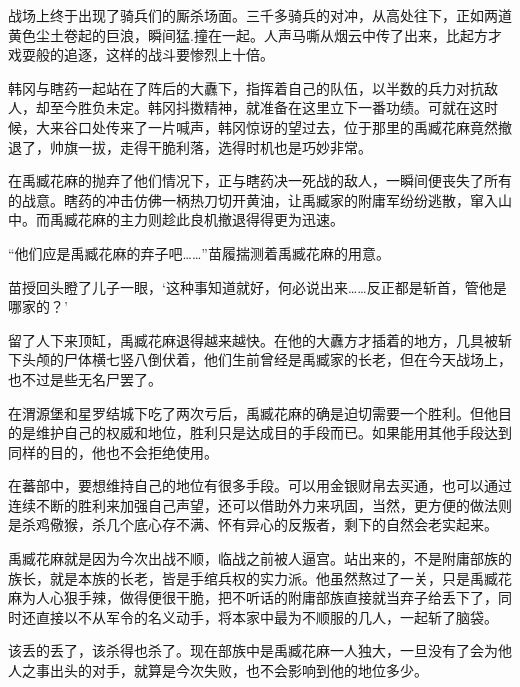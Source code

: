 战场上终于出现了骑兵们的厮杀场面。三千多骑兵的对冲，从高处往下，正如两道黄色尘土卷起的巨浪，瞬间猛.撞在一起。人声马嘶从烟云中传了出来，比起方才戏耍般的追逐，这样的战斗要惨烈上十倍。

韩冈与瞎药一起站在了阵后的大纛下，指挥着自己的队伍，以半数的兵力对抗敌人，却至今胜负未定。韩冈抖擞精神，就准备在这里立下一番功绩。可就在这时候，大来谷口处传来了一片喊声，韩冈惊讶的望过去，位于那里的禹臧花麻竟然撤退了，帅旗一拔，走得干脆利落，选得时机也是巧妙非常。

在禹臧花麻的抛弃了他们情况下，正与瞎药决一死战的敌人，一瞬间便丧失了所有的战意。瞎药的冲击仿佛一柄热刀切开黄油，让禹臧家的附庸军纷纷逃散，窜入山中。而禹臧花麻的主力则趁此良机撤退得得更为迅速。

“他们应是禹臧花麻的弃子吧……”苗履揣测着禹臧花麻的用意。

苗授回头瞪了儿子一眼，‘这种事知道就好，何必说出来……反正都是斩首，管他是哪家的？’

留了人下来顶缸，禹臧花麻退得越来越快。在他的大纛方才插着的地方，几具被斩下头颅的尸体横七竖八倒伏着，他们生前曾经是禹臧家的长老，但在今天战场上，也不过是些无名尸罢了。

在渭源堡和星罗结城下吃了两次亏后，禹臧花麻的确是迫切需要一个胜利。但他目的是维护自己的权威和地位，胜利只是达成目的手段而已。如果能用其他手段达到同样的目的，他也不会拒绝使用。

在蕃部中，要想维持自己的地位有很多手段。可以用金银财帛去买通，也可以通过连续不断的胜利来加强自己声望，还可以借助外力来巩固，当然，更方便的做法则是杀鸡儆猴，杀几个底心存不满、怀有异心的反叛者，剩下的自然会老实起来。

禹臧花麻就是因为今次出战不顺，临战之前被人逼宫。站出来的，不是附庸部族的族长，就是本族的长老，皆是手绾兵权的实力派。他虽然熬过了一关，只是禹臧花麻为人心狠手辣，做得便很干脆，把不听话的附庸部族直接就当弃子给丢下了，同时还直接以不从军令的名义动手，将本家中最为不顺服的几人，一起斩了脑袋。

该丢的丢了，该杀得也杀了。现在部族中是禹臧花麻一人独大，一旦没有了会为他人之事出头的对手，就算是今次失败，也不会影响到他的地位多少。

